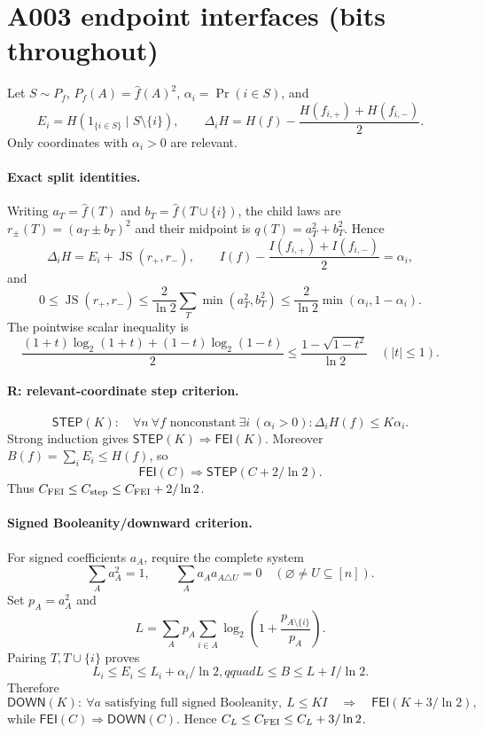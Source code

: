 \section*{A003 endpoint interfaces (bits throughout)}
Let $S\sim P_f$, $P_f(A)=\widehat f(A)^2$, $\alpha_i=\Pr(i\in S)$, and
\[
 E_i=H(1_{\{i\in S\}}\mid S\setminus\{i\}),\qquad
 \Delta_iH=H(f)-\frac{H(f_{i,+})+H(f_{i,-})}{2}.
\]
Only coordinates with $\alpha_i>0$ are relevant.

\paragraph{Exact split identities.}
Writing $a_T=\widehat f(T)$ and $b_T=\widehat f(T\cup\{i\})$, the child laws are
$r_\pm(T)=(a_T\pm b_T)^2$ and their midpoint is $q(T)=a_T^2+b_T^2$. Hence
\[
 \Delta_iH=E_i+\operatorname{JS}(r_+,r_-),\qquad
 I(f)-\frac{I(f_{i,+})+I(f_{i,-})}{2}=\alpha_i,
\]
and
\[
 0\le\operatorname{JS}(r_+,r_-)
 \le\frac2{\ln2}\sum_T\min(a_T^2,b_T^2)
 \le\frac2{\ln2}\min(\alpha_i,1-\alpha_i).
\]
The pointwise scalar inequality is
\[
 \frac{(1+t)\log_2(1+t)+(1-t)\log_2(1-t)}2
 \le\frac{1-\sqrt{1-t^2}}{\ln2}\quad(|t|\le1).
\]

\paragraph{R: relevant-coordinate step criterion.}
\[
 \mathsf{STEP}(K):\quad
 \forall n\ \forall f\text{ nonconstant}\ \exists i\ (\alpha_i>0):
 \Delta_iH(f)\le K\alpha_i.
\]
Strong induction gives $\mathsf{STEP}(K)\Rightarrow\mathsf{FEI}(K)$.
Moreover $B(f)=\sum_iE_i\le H(f)$, so
\[
 \mathsf{FEI}(C)\Rightarrow\mathsf{STEP}(C+2/\ln2).
\]
Thus $C_{\rm FEI}\le C_{\rm step}\le C_{\rm FEI}+2/\ln2$.

\paragraph{Signed Booleanity/downward criterion.}
For signed coefficients $a_A$, require the complete system
\[
 \sum_Aa_A^2=1,\qquad \sum_Aa_Aa_{A\triangle U}=0
 \quad(\varnothing\ne U\subseteq[n]).
\]
Set $p_A=a_A^2$ and
\[
 L=\sum_Ap_A\sum_{i\in A}\log_2\left(1+\frac{p_{A\setminus\{i\}}}{p_A}\right).
\]
Pairing $T,T\cup\{i\}$ proves
\[
 L_i\le E_i\le L_i+\alpha_i/\ln2,qquad L\le B\le L+I/\ln2.
\]
Therefore
\[
 \mathsf{DOWN}(K):\ \forall a\text{ satisfying full signed Booleanity},\ L\le KI
 \quad\Longrightarrow\quad \mathsf{FEI}(K+3/\ln2),
\]
while $\mathsf{FEI}(C)\Rightarrow\mathsf{DOWN}(C)$. Hence
$C_L\le C_{\rm FEI}\le C_L+3/\ln2$.

